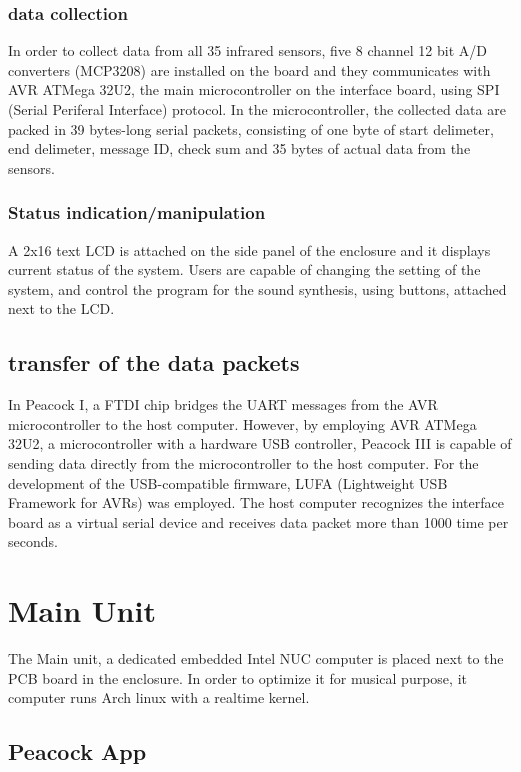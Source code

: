 \documentclass{nime-alternate}
\begin{document}
\subsubsection{data collection} %
In order to collect data from all 35 infrared sensors, five 8 channel 12 bit A/D converters (MCP3208) are installed on the board and they communicates with AVR ATMega 32U2, the main microcontroller on the interface board, using SPI (Serial Periferal Interface) protocol. In the microcontroller, the collected data are packed in 39 bytes-long serial packets, consisting of one byte of start delimeter, end delimeter, message ID, check sum and 35 bytes of actual data from the sensors.

\subsubsection{Status indication/manipulation} %

A 2x16 text LCD is attached on the side panel of the enclosure and it displays current status of the system. Users are capable of changing the setting of the system, and control the program for the sound synthesis, using buttons, attached next to the LCD.

\subsection{transfer of the data packets} %

In Peacock I, a FTDI chip bridges the UART messages from the AVR microcontroller to the host computer.
However, by employing AVR ATMega 32U2, a microcontroller with a hardware USB controller, Peacock III is capable of sending data directly from the microcontroller to the host computer. For the development of the USB-compatible firmware, LUFA (Lightweight USB Framework for AVRs)\cite{camera:lufa} was employed. The host computer recognizes the interface board as a virtual serial device and receives data packet more than 1000 time per seconds. 

\section{Main Unit} %
The Main unit, a dedicated embedded Intel NUC computer\cite{intel:nuc} is placed next to the PCB board in the enclosure. In order to optimize it for musical purpose, it computer runs Arch linux with a realtime kernel.

\subsection{Peacock App}
\end{document}
